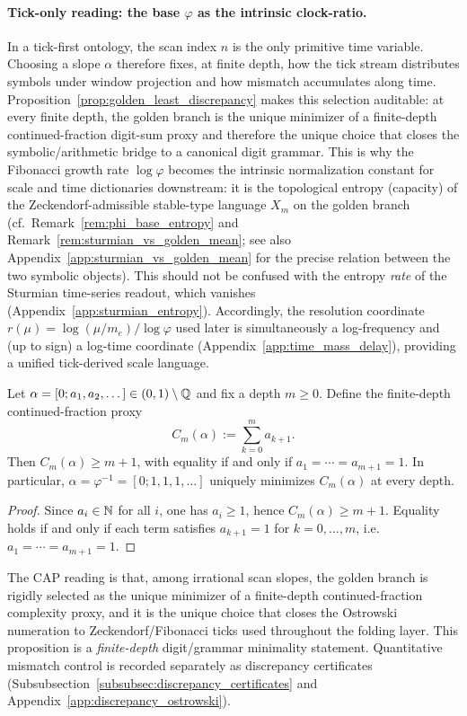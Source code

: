 \paragraph{Tick-only reading: the base \texorpdfstring{$\varphi$}{phi} as the intrinsic clock-ratio.}
In a tick-first ontology, the scan index $n$ is the only primitive time variable.
Choosing a slope $\alpha$ therefore fixes, at finite depth, how the tick stream distributes symbols under window projection and how mismatch accumulates along time.
Proposition~\ref{prop:golden_least_discrepancy} makes this selection auditable: at every finite depth, the golden branch is the unique minimizer of a finite-depth continued-fraction digit-sum proxy and therefore the unique choice that closes the symbolic/arithmetic bridge to a canonical digit grammar.
This is why the Fibonacci growth rate $\log\varphi$ becomes the intrinsic normalization constant for scale and time dictionaries downstream: it is the topological entropy (capacity) of the Zeckendorf-admissible stable-type language $X_m$ on the golden branch (cf.\ Remark~\ref{rem:phi_base_entropy} and Remark~\ref{rem:sturmian_vs_golden_mean}; see also Appendix~\ref{app:sturmian_vs_golden_mean} for the precise relation between the two symbolic objects).
This should not be confused with the entropy \emph{rate} of the Sturmian time-series readout, which vanishes (Appendix~\ref{app:sturmian_entropy}).
Accordingly, the resolution coordinate $r(\mu)=\log(\mu/m_e)/\log\varphi$ used later is simultaneously a log-frequency and (up to sign) a log-time coordinate (Appendix~\ref{app:time_mass_delay}), providing a unified tick-derived scale language.

\begin{proposition}\label{prop:golden_least_discrepancy}
Let $\alpha=[0;a_1,a_2,\dots]\in(0,1)\setminus\mathbb{Q}$ and fix a depth $m\ge 0$.
Define the finite-depth continued-fraction proxy
\[
C_m(\alpha):=\sum_{k=0}^{m} a_{k+1}.
\]
Then $C_m(\alpha)\ge m+1$, with equality if and only if $a_1=\cdots=a_{m+1}=1$.
In particular, $\alpha=\varphi^{-1}=[0;1,1,1,\dots]$ uniquely minimizes $C_m(\alpha)$ at every depth.
\end{proposition}
\begin{proof}
Since $a_i\in\mathbb{N}$ for all $i$, one has $a_i\ge 1$, hence $C_m(\alpha)\ge m+1$.
Equality holds if and only if each term satisfies $a_{k+1}=1$ for $k=0,\dots,m$, i.e.\ $a_1=\cdots=a_{m+1}=1$.
\end{proof}
The CAP reading is that, among irrational scan slopes, the golden branch is rigidly selected as the unique minimizer of a finite-depth continued-fraction complexity proxy, and it is the unique choice that closes the Ostrowski numeration to Zeckendorf/Fibonacci ticks used throughout the folding layer.
\AuditTag This proposition is a \emph{finite-depth} digit/grammar minimality statement. Quantitative mismatch control is recorded separately as discrepancy certificates (Subsubsection~\ref{subsubsec:discrepancy_certificates} and Appendix~\ref{app:discrepancy_ostrowski}).

